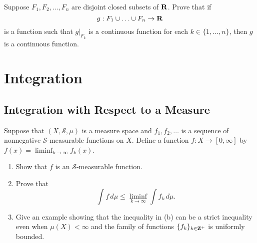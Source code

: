 \documentclass[11pt,oneside]{book}
\begin{document}
\begin{exercise}
    Suppose $F_1,F_2,\ldots,F_n$ are disjoint closed subsets of $\mathbf{R}$. Prove that if \[
    g: F_1 \cup \ldots \cup F_n \to \mathbf{R}
    \]
    is a function such that $g|_{F_k}$ is a continuous function for each $k\in \{1,\ldots,n\}$, then $g$ is a continuous function.
\end{exercise}
\begin{solution}
    
\end{solution}





\chapter{Integration}


\section{Integration with Respect to a Measure}

\begin{exercise}
    Suppose that $(X, \mathscr{S}, \mu)$ is a measure space and $f_1, f_2, \ldots$ is a sequence of nonnegative $\mathscr{S}$-measurable functions on $X$. Define a function $f: X \to [0, \infty]$ by $f(x) = \liminf_{k \to \infty} f_k(x)$.
    \begin{enumerate}[label=(\alph*)]
        \item Show that $f$ is an $\mathscr{S}$-measurable function.

        \item Prove that \[\int f \, d\mu \leq \liminf_{k \to \infty} \int f_k \, d\mu.\]

        \item Give an example showing that the inequality in (b) can be a strict inequality even when $\mu(X) < \infty$ and the family of functions $\{f_k\}_{k \in \mathbf{Z}^+}$ is uniformly bounded.
    \end{enumerate}
\end{exercise}
\end{document}
